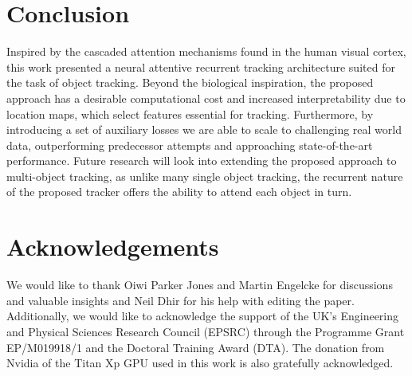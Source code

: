 \section{Conclusion}
\label{sec:hart_conclusion}
    
    Inspired by the cascaded attention mechanisms found in the human visual cortex, this work presented a neural attentive recurrent tracking architecture suited for the task of object tracking. Beyond the biological inspiration, the proposed approach has a desirable computational cost and increased interpretability due to location maps, which select features essential for tracking. Furthermore, by introducing a set of auxiliary losses we are able to scale to challenging real world data, outperforming predecessor attempts and approaching state-of-the-art performance. Future research will look into extending the proposed approach to multi-object tracking, as unlike many single object tracking, the recurrent nature of the proposed tracker offers the ability to attend each object in turn. 
  
\section*{Acknowledgements}
    
  We would like to thank Oiwi Parker Jones and Martin Engelcke for discussions and valuable insights and Neil Dhir for his help with editing the paper. Additionally, we would like to acknowledge the support of the UK’s Engineering and Physical Sciences Research Council (EPSRC) through the Programme Grant EP/M019918/1 and the Doctoral Training Award (DTA). The donation from Nvidia of the Titan Xp GPU used in this work is also gratefully acknowledged.